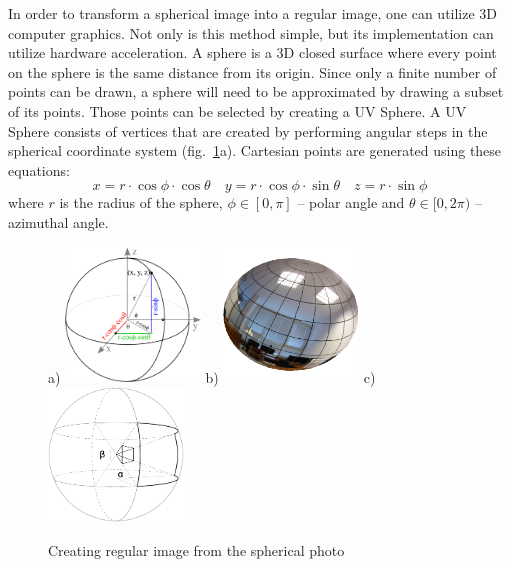 \documentclass{svproc}
\begin{document}
In order to transform a spherical image into a regular image, one can utilize 3D computer graphics.
Not only is this method simple, but its implementation can utilize hardware acceleration.
A sphere is a 3D closed surface where every point on the sphere is the same distance from its origin. %
Since only a finite number of points can be drawn, a sphere will need to be approximated by drawing a subset of its points.
Those points can be selected by creating a UV Sphere.
A UV Sphere consists of vertices that are created by performing angular steps in the spherical coordinate system (fig.~\ref{fig:spheres}a).
Cartesian points are generated using these equations:
\begin{equation}
    x = r \cdot \cos \phi \cdot \cos \theta \quad y = r \cdot \cos \phi \cdot \sin \theta \quad z = r \cdot \sin \phi \nonumber
\end{equation}
where $r$ is the radius of the sphere, $\phi \in [0, \pi]$ -- polar angle and $\theta \in [0, 2\pi)$ -- azimuthal angle.

\begin{figure}[ht!]
    \centering
    a) \hspace{-3mm}\includegraphics[width=0.32\textwidth]{img/genpoint}
    b) \hspace{-3mm}\includegraphics[width=0.32\textwidth]{img/gl_sphere/textured}
    c) \hspace{-3mm}\includegraphics[width=0.32\textwidth]{img/sphere}
    \caption{Creating regular image from the spherical photo}
    \label{fig:spheres}
\end{figure}
\end{document}
